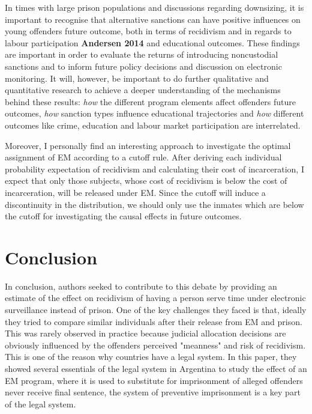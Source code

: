 \documentclass[a4paper,12pt]{article}
\begin{document}
In times with large prison populations and discussions regarding downsizing, it is important to recognise that alternative sanctions can have positive influences on young offenders future outcome, both in terms of recidivism and in regards to labour participation \textbf{Andersen 2014} \cite{Andersen2014} and educational outcomes. These findings are important in order to evaluate the returns of introducing noncustodial sanctions and to inform future policy decisions and discussion on electronic monitoring. It will, however, be important to do further qualitative and quantitative research to achieve a deeper understanding of the mechanisms behind these results: \textit{how} the different program elements affect offenders future outcomes, \textit{how} sanction types influence educational trajectories and \textit{how} different outcomes like crime, education and labour market participation are interrelated. 

Moreover, I personally find an interesting approach to investigate the optimal assignment of EM according to a cutoff rule. After deriving each individual probability expectation of recidivism and calculating their cost of incarceration, I expect that only those subjects, whose cost of recidivism is below the cost of incarceration, will be released under EM. Since the cutoff will induce a discontinuity in the distribution, we should only use the  inmates which are below the cutoff for investigating the causal effects in future outcomes. 

\section{Conclusion}
In conclusion, authors seeked to contribute to this debate by providing an estimate of the effect on recidivism of having a person serve time under electronic surveillance instead of prison. One of the key challenges they faced is that, ideally they tried to compare similar individuals after their release from EM and prison. This was rarely observed in practice because judicial allocation decisions are obviously influenced by the offenders perceived "meanness" and risk of recidivism. This is one of the reason why countries have a legal system. In this paper, they showed several essentials of the legal system in Argentina to study the effect of an EM program, where it is used to substitute for imprisonment of alleged offenders never receive final sentence, the system of preventive imprisonment is a key part of the legal system. 
\end{document}
